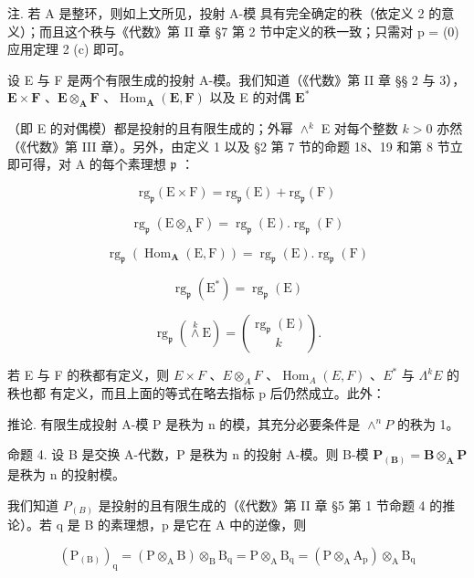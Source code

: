 注. 若 A 是整环，则如上文所见，投射 A-模 具有完全确定的秩（依定义 2 的意义）；而且这个秩与《代数》第 II 章 §7 第 2 节中定义的秩一致；只需对 p = (0) 应用定理 2 (c) 即可。

设 E 与 F 是两个有限生成的投射 A-模。我们知道（《代数》第 II 章 §§ 2 与 3），\(\mathbf{E} \times \mathbf{F}\) 、\(\mathbf{E} \otimes_{\mathbf{A}} \mathbf{F}\) 、\(\operatorname{Hom}_{\mathbf{A}}(\mathbf{E}, \mathbf{F})\) 以及 E 的对偶 \(\mathbf{E}^*\)

（即 E 的对偶模）都是投射的且有限生成的；外幂 \(\wedge^k\) E 对每个整数 \(k > 0\) 亦然（《代数》第 III 章）。另外，由定义 1 以及 §2 第 7 节的命题 18、19 和第 8 节立即可得，对 A 的每个素理想 \(\mathfrak{p}\) ：

\[
\mathrm{rg} _ {\mathfrak {p}} (\mathrm{E} \times \mathrm{F}) = \mathrm{rg} _ {\mathfrak {p}} (\mathrm{E}) + \mathrm{rg} _ {\mathfrak {p}} (\mathrm{F})\tag{1}
\]

\[
\operatorname{rg} _ {\mathfrak {p}} (\mathrm{E} \otimes_ {\mathrm{A}} \mathrm{F}) = \operatorname{rg} _ {\mathfrak {p}} (\mathrm{E}). \operatorname{rg} _ {\mathfrak {p}} (\mathrm{F})\tag{2}
\]

\[
\operatorname{rg} _ {\mathfrak {p}} (\operatorname{Hom} _ {\mathbf {A}} (\mathrm{E}, \mathrm{F})) = \operatorname{rg} _ {\mathfrak {p}} (\mathrm{E}). \operatorname{rg} _ {\mathfrak {p}} (\mathrm{F})\tag{3}
\]

\[
\operatorname{rg} _ {\mathfrak {p}} (\mathrm{E} ^ {*}) = \operatorname{rg} _ {\mathfrak {p}} (\mathrm{E})\tag{4}
\]

\[
\operatorname{rg} _ {\mathfrak {p}} (\overset {k} {\wedge} \mathrm{E}) = \binom{\operatorname{rg} _ {\mathfrak {p}} (\mathrm{E})}{k}.\tag{5}
\]

若 E 与 F 的秩都有定义，则 \(E \times F\) 、\(E \otimes_{A} F\) 、\(\operatorname{Hom}_{A}(E, F)\) 、\(E^{*}\) 与 \(\Lambda^{k} E\) 的秩也都 有定义，而且上面的等式在略去指标 p 后仍然成立。此外：

推论. 有限生成投射 A-模 P 是秩为 n 的模，其充分必要条件是 \(\wedge^{n}P\) 的秩为 1。

命题 4. 设 B 是交换 A-代数，P 是秩为 n 的投射 A-模。则 B-模 \(\mathbf{P}_{(\mathbf{B})} = \mathbf{B} \otimes_{\mathbf{A}} \mathbf{P}\) 是秩为 n 的投射模。

我们知道 \(P_{(B)}\) 是投射的且有限生成的（《代数》第 II 章 §5 第 1 节命题 4 的推论）。若 q 是 B 的素理想，p 是它在 A 中的逆像，则

\[
\left(\mathrm{P} _ {(\mathrm{B})}\right) _ {\mathrm{q}} = \left(\mathrm{P} \otimes_ {\mathrm{A}} \mathrm{B}\right) \otimes_ {\mathrm{B}} \mathrm{B} _ {\mathrm{q}} = \mathrm{P} \otimes_ {\mathrm{A}} \mathrm{B} _ {\mathrm{q}} = \left(\mathrm{P} \otimes_ {\mathrm{A}} \mathrm{A} _ {\mathrm{p}}\right) \otimes_ {\mathrm{A}} \mathrm{B} _ {\mathrm{q}}
\]

